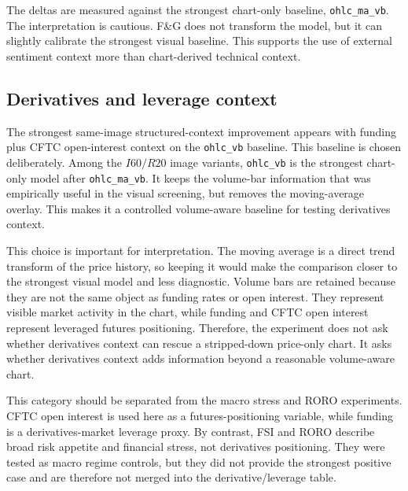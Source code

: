 \documentclass[14pt,a4paper]{extarticle}
\newcommand{\code}[1]{\texttt{#1}}
\begin{document}
The deltas are measured against the strongest chart-only baseline, \code{ohlc\_ma\_vb}. The interpretation is cautious. F\&G does not transform the model, but it can slightly calibrate the strongest visual baseline. This supports the use of external sentiment context more than chart-derived technical context.

\subsection{Derivatives and leverage context}

The strongest same-image structured-context improvement appears with funding plus CFTC open-interest context on the \code{ohlc\_vb} baseline.
This baseline is chosen deliberately. Among the $I60/R20$ image variants, \code{ohlc\_vb} is the strongest chart-only model after \code{ohlc\_ma\_vb}. It keeps the volume-bar information that was empirically useful in the visual screening, but removes the moving-average overlay. This makes it a controlled volume-aware baseline for testing derivatives context.

This choice is important for interpretation. The moving average is a direct trend transform of the price history, so keeping it would make the comparison closer to the strongest visual model and less diagnostic. Volume bars are retained because they are not the same object as funding rates or open interest. They represent visible market activity in the chart, while funding and CFTC open interest represent leveraged futures positioning. Therefore, the experiment does not ask whether derivatives context can rescue a stripped-down price-only chart. It asks whether derivatives context adds information beyond a reasonable volume-aware chart.

This category should be separated from the macro stress and RORO experiments. CFTC open interest is used here as a futures-positioning variable, while funding is a derivatives-market leverage proxy. By contrast, FSI and RORO describe broad risk appetite and financial stress, not derivatives positioning. They were tested as macro regime controls, but they did not provide the strongest positive case and are therefore not merged into the derivative/leverage table.
\end{document}
